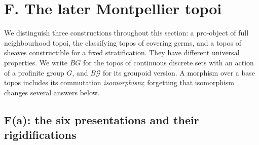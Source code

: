 \section{F. The later Montpellier topoi}
\label{sec:F}

We distinguish three constructions throughout this section: a pro-object of
full neighbourhood topoi, the classifying topos of covering germs, and a topos
of sheaves constructible for a fixed stratification. They have different
universal properties. We write $B G$ for the topos of continuous discrete
sets with an action of a profinite group $G$, and $B\mathcal G$ for its
groupoid version. A morphism over a base topos includes its commutation
\emph{isomorphism}; forgetting that isomorphism changes several answers below.

\subsection{F(a): the six presentations and their rigidifications}

